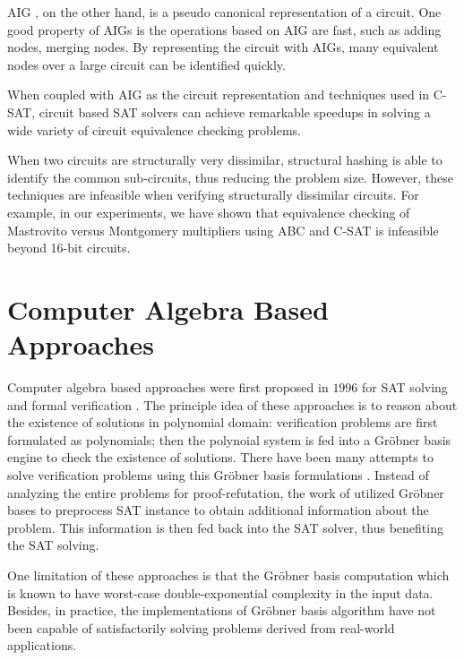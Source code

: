 AIG \cite{AIG:2002}, on the other hand, is a pseudo canonical representation of a circuit. 
One good property of AIGs is the operations based on AIG are fast, such as adding nodes, merging nodes. By representing the circuit with AIGs, 
many equivalent nodes over a large circuit can be identified quickly.

When coupled with AIG as the circuit representation and techniques used in C-SAT, circuit based SAT solvers
can achieve remarkable speedups in solving a wide variety of circuit equivalence checking problems.

When two circuits are structurally very dissimilar, structural hashing is able to identify the common sub-circuits, thus reducing the problem size.
However, these techniques are infeasible when verifying structurally dissimilar circuits.
For example, in our experiments, we have shown that equivalence checking of Mastrovito versus Montgomery multipliers 
using ABC \cite{abc} and C-SAT \cite{csat} is infeasible beyond 16-bit circuits.
\section{Computer Algebra Based Approaches}
Computer algebra based approaches were first proposed in $1996$ for SAT solving and formal verification \cite{CEI:stoc-96} \cite{Avrunin:CAV}. 
The principle idea of these approaches is to reason about the existence of solutions in polynomial domain: 
verification problems are first formulated as polynomials; then the polynoial system is fed into a Gr\"obner basis engine 
to check the existence of solutions. 
There have been many attempts to solve verification problems using this Gr\"obner basis formulations \cite{gbverify:2007}.
Instead of analyzing the entire problems for proof-refutation, 
the work of \cite{condrat-tacas07} utilized Gr\"obner bases to preprocess SAT instance 
to obtain additional information about the problem. This information is then fed back into the SAT solver, thus benefiting the SAT solving.

One limitation of these approaches is that the Gr\"obner basis computation 
which is known to have worst-case double-exponential complexity in the input data.
Besides, in practice, the implementations of Gr\"obner basis algorithm have not been capable of satisfactorily
solving problems derived from real-world applications.

